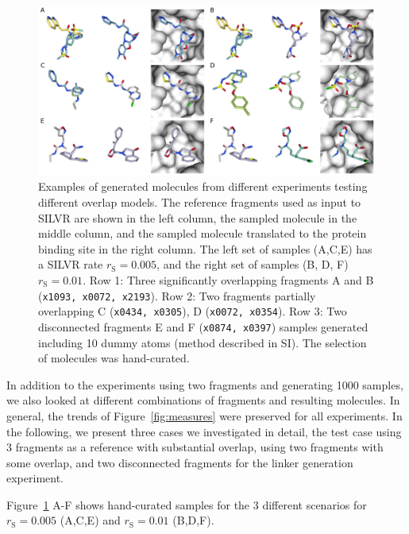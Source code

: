 \documentclass[journal=jacsat,manuscript=article]{achemso}
\begin{document}
\begin{figure}[!htb]
    \centering
    \includegraphics[width=\textwidth]{paper/Figures/Fig4/fig_4_ref_sample_bound.png}
    \caption{Examples of generated molecules from different experiments testing different overlap models. The reference fragments used as input to SILVR  are shown in the left column, the sampled molecule in the middle column, and the sampled molecule translated to the protein binding site in the right column. The left set of samples (A,C,E) has a SILVR rate $r_{\mathrm{S}}=0.005$, and the right set of samples (B, D, F) $r_{\mathrm{S}}=0.01$. Row 1: Three significantly overlapping fragments A and B (\texttt{x1093, x0072, x2193}). Row 2: Two fragments partially overlapping C (\texttt{x0434, x0305}), D (\texttt{x0072, x0354}). Row 3: Two disconnected fragments E and F (\texttt{x0874, x0397}) samples generated including 10 dummy atoms (method described in SI). The selection of molecules was hand-curated.}
    \label{fig:samples}
\end{figure}

In addition to the experiments using two fragments and generating 1000 samples, we also looked at different combinations of fragments and resulting molecules. In general, the trends of Figure~\ref{fig:measures} were preserved for all experiments. In the following, we present three cases we investigated in detail, the test case using 3 fragments as a reference with substantial overlap, using two fragments with some overlap, and two disconnected fragments for the linker generation experiment. 

Figure~\ref{fig:samples} A-F shows hand-curated samples for the 3 different scenarios for $r_{\mathrm{S}}=0.005$ (A,C,E) and $r_{\mathrm{S}}=0.01$ (B,D,F).
\end{document}
